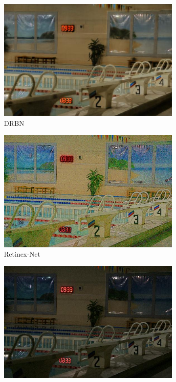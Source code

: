 \documentclass[a4paper, 10pt]{article}
\begin{document}
\begin{figure}[htb]
\begin{subfigure}{0.19\textwidth}
				\includegraphics[width=\linewidth]{picture/LLIE/Experiment/DRBN}
				\captionsetup{font=scriptsize}
				\caption{DRBN}
				\label{fig: DRBN}
			\end{subfigure}
			\begin{subfigure}{0.19\textwidth}
				\includegraphics[width=\linewidth]{picture/LLIE/Experiment/Retinex-Net}
				\captionsetup{font=scriptsize}
				\caption{Retinex-Net}
				\label{fig: Retinex-Net}
			\end{subfigure}
			\begin{subfigure}{0.19\textwidth}
				\includegraphics[width=\linewidth]{picture/LLIE/Experiment/RRDNet}

\end{subfigure}
\end{figure}
\end{document}
